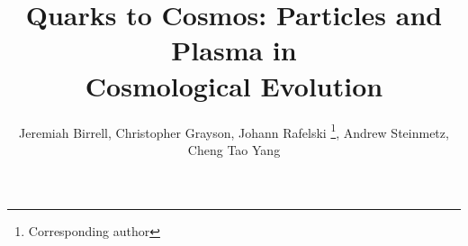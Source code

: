 \title{Quarks to Cosmos: Particles and Plasma in\\ 
 Cosmological Evolution}

\author{
Jeremiah Birrell, %
Christopher Grayson, %
Johann Rafelski%
\fnmsep\thanks{Corresponding author%
}, 
\newline Andrew Steinmetz, %
Cheng Tao Yang
}


